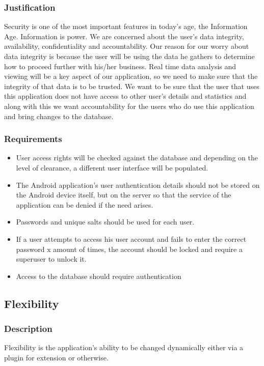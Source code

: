 \documentclass[11pt,fleqn]{book} %
\begin{document}
			\subsubsection{Justification}
				Security is one of the most important features in today’s age, the Information Age. Information is power. We are concerned about the user’s data integrity, availability, confidentiality and accountability.\newline
				Our reason for our worry about data integrity is because the user will be using the data he gathers to determine how to proceed further with his/her business. Real time data analysis and viewing will be a key aspect of our application, so we need to make sure that the integrity of that data is to be trusted.\newline
				We want to be sure that the user that uses this application does not have access to other user’s details and statistics and along with this we want accountability for the users who do use this application and bring changes to the database.
			\subsubsection{Requirements}
				\begin{itemize}
					\item User access rights will be checked against the database and depending on the level of clearance, a different user interface will be populated.
					\item The Android application’s user authentication details should not be stored on the Android device itself, but on the server so that the service of the application can be denied if the need arises.
					\item Passwords and unique salts should be used for each user.
					\item If a user attempts to access his user account and fails to enter the correct password x amount of times, the account should be locked and require a superuser to unlock it.
					\item Access to the database should require authentication
				\end{itemize}
		\subsection{Flexibility}
			\subsubsection{Description}
				Flexibility is the application’s ability to be changed dynamically either via a plugin for extension or otherwise.
\end{document}
